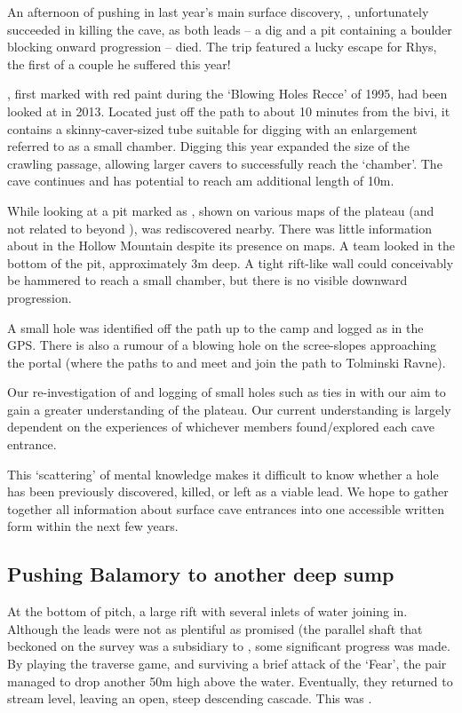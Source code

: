 An afternoon of pushing in last year's main surface discovery, , unfortunately succeeded in killing the cave, as both leads – a dig and a pit containing a boulder blocking onward progression – died. The trip featured a lucky escape for Rhys, the first of a couple he suffered this year!

, first marked with red paint during the `Blowing Holes Recce' of 1995, had been looked at in 2013. Located just off the path to  about 10 minutes from the bivi, it contains a skinny-caver-sized tube suitable for digging with an enlargement referred to as a small chamber. Digging this year expanded the size of the crawling passage, allowing larger cavers to successfully reach the `chamber'. The cave continues and  has potential to reach am additional length of 10m.

While looking at  a pit marked as , shown on various maps of the plateau (and not related to  beyond ), was rediscovered nearby. There was little information about  in the Hollow Mountain despite its presence on maps. A team looked in the bottom of the pit, approximately 3m deep. A tight rift-like wall could conceivably be hammered to reach a small chamber, but there is no visible downward progression. 

A small hole was identified off the path up to the camp and logged as  in the GPS. There is also a rumour of a blowing hole on the scree-slopes approaching the portal (where the paths to  and  meet and join the path to Tolminski Ravne).


Our re-investigation of  and logging of small holes such as  ties in with our aim to gain a greater understanding of the plateau. Our current understanding is largely dependent on the experiences of whichever members found/explored each cave entrance.

This `scattering' of mental knowledge makes it difficult to know whether a hole has been previously discovered, killed, or left as a viable lead. We hope to gather together all information about surface cave entrances into one accessible written form within the next few years.


\subsection{Pushing Balamory to another deep sump}
 At the bottom of  pitch, a large rift with several inlets of water joining in.  Although the leads were not as plentiful as promised (the parallel shaft that beckoned on the survey was a subsidiary to , some significant progress was made. By playing the traverse game, and surviving a brief attack of the `Fear', the pair managed to drop another 50m high above the water. Eventually, they returned to stream level, leaving an open, steep descending cascade. This was .


